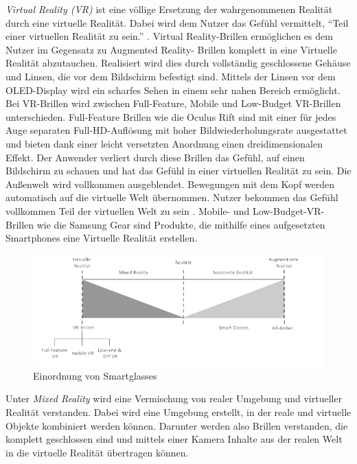 \emph{Virtual Reality (VR)} ist eine völlige Ersetzung der wahrgenommenen Realität durch eine virtuelle Realität. Dabei wird dem Nutzer das Gefühl vermittelt, \enquote{Teil einer virtuellen Realität zu sein.} \cite[S.~22]{ThomasDirkMetzgerHelmutNiegemannHrsg2018}. Virtual Reality-Brillen ermöglichen es dem Nutzer im Gegensatz zu Augmented Reality- Brillen komplett in eine Virtuelle Realität abzutauchen. Realisiert wird dies durch vollständig geschlossene Gehäuse und Linsen, die vor dem Bildschirm befestigt sind. Mittels der Linsen vor dem OLED-Display wird ein scharfes Sehen in einem sehr nahen Bereich ermöglicht. Bei VR-Brillen wird zwischen Full-Feature, Mobile und Low-Budget VR-Brillen unterschieden. Full-Feature Brillen wie die Oculus Rift sind mit einer für jedes Auge separaten Full-HD-Auflösung mit hoher Bildwiederholungsrate ausgestattet und bieten dank einer leicht versetzten Anordnung einen dreidimensionalen Effekt. Der Anwender verliert durch diese Brillen das Gefühl, auf einen Bildschirm zu schauen und hat das Gefühl in einer virtuellen Realität zu sein. Die Außenwelt wird vollkommen ausgeblendet. Bewegungen mit dem Kopf werden automatisch auf die virtuelle Welt übernommen. Nutzer bekommen das Gefühl vollkommen Teil der virtuellen Welt zu sein \cite[S.~22ff]{ThomasDirkMetzgerHelmutNiegemannHrsg2018}. Mobile- und Low-Budget-VR-Brillen wie die Samsung Gear sind Produkte, die mithilfe eines aufgesetzten Smartphones eine Virtuelle Realität erstellen.
\begin{figure}[htbp]
    \centering
    \includegraphics[width=1\textwidth]{data/bilder/VRvsAR.pdf}
    \caption{Einordnung von Smartglasses \cite{ThomasDirkMetzgerHelmutNiegemannHrsg2018}}
    \label{fig:Einordnung_Von_Smartglasses}
\end{figure}
Unter \emph{Mixed Reality} wird eine Vermischung von realer Umgebung und virtueller Realität verstanden. Dabei wird eine Umgebung erstellt, in der reale und virtuelle Objekte kombiniert werden können. Darunter werden also Brillen verstanden, die komplett geschlossen sind und mittels einer Kamera Inhalte aus der realen Welt in die virtuelle Realität übertragen können.

